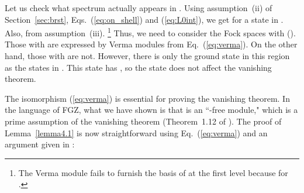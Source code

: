 \documentclass[a4paper,12pt]{article}
\providecommand{\ket}[1]{\mbox{\myHighlight{$| #1 \rangle$}\coordHE{}}}
\providecommand{\eq}[1]{(\ref{eq:#1})}
\providecommand{\hN}{\hat{N}^g}
\begin{document}
Let us check what spectrum actually appears in \coordHE{}. Using assumption~(ii) of Section~\ref{sec:brst}, Eqs.~\eq{on_shell} and \eq{L0int},  we get \coordHE{} for a state in \coordHE{}. Also, \coordHE{} from assumption~(iii).%
\footnote{%
The Verma module \coordHE{} fails to furnish the basis of \coordHE{} at the first level because \myHighlight{$L^{X}_{-1} \ket{h^{X}=0} = 0$}\coordHE{} for \coordHE{}.\label{ft:exceptional}}
Thus, we need to consider the Fock spaces \coordHE{} with \coordHE{} (\coordHE{}). Those with \coordHE{} are expressed by Verma modules from Eq.~\eq{verma}. On the other hand, those with \coordHE{} are not. However, there is only the ground state in this region as the states in \coordHE{}. This state has \myHighlight{$\hN=0$}\coordHE{}, so the state does not affect the vanishing theorem.

The isomorphism \eq{verma} is essential for proving the vanishing theorem.
In the language of FGZ, what we have shown is that \coordHE{} is an ``\coordHE{}-free module," which is a prime
assumption of the vanishing theorem (Theorem~1.12 of \cite{FGZ}). The proof
of Lemma~\ref{lemma4.1} is now straightforward using 
Eq.~\eq{verma} and an argument given in \cite{FK}:
\end{document}
